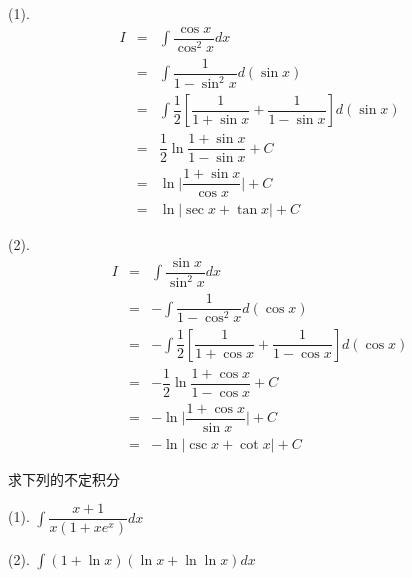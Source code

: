 \begin{solution}

	(1). 
	\begin{eqnarray*}
		I & = & \int \dfrac{\cos x}{\cos ^{2}x}dx\\
		  & = & \int \dfrac{1}{1-\sin^{2}x}d(\sin x)\\
		  & = & \int \dfrac{1}{2}\left[\dfrac{1}{1+\sin x}+\dfrac{1}{1-\sin x}\right]d(\sin x)\\
		  & = & \dfrac{1}{2} \ln \dfrac{1+\sin x}{1-\sin x} +C\\
		  & = & \ln \big|\dfrac{1+\sin x}{\cos x}\big| +C\\
		  & = & \ln \big|\sec x + \tan x\big| +C 
	\end{eqnarray*}

	(2). 
	\begin{eqnarray*}
		I & = & \int \dfrac{\sin x}{\sin ^{2}x}dx\\
		  & = & -\int \dfrac{1}{1-\cos^{2}x}d(\cos x)\\
		  & = & -\int \dfrac{1}{2}\left[\dfrac{1}{1+\cos x}+\dfrac{1}{1-\cos x}\right]d(\cos x)\\
		  & = & -\dfrac{1}{2} \ln \dfrac{1+\cos x}{1-\cos x} +C\\
		  & = & -\ln \big|\dfrac{1+\cos x}{\sin x}\big| +C\\
		  & = & -\ln \big|\csc x + \cot x\big| +C 
	\end{eqnarray*}

\end{solution}

\begin{example}[][Exam: 28.2.6]
	求下列的不定积分

(1). $\displaystyle{\int \dfrac{x+1}{x(1+xe^{x})}dx}$

(2). $\displaystyle{\int (1+\ln x)(\ln x+\ln\ln x)dx}$
\end{example}

